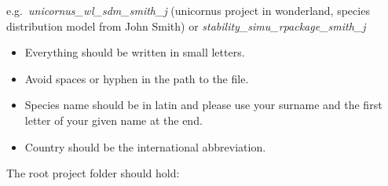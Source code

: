 \documentclass[
  english,
]{article}
\providecommand{\tightlist}{%
  \setlength{\itemsep}{0pt}\setlength{\parskip}{0pt}}
\begin{document}
e.g.~\emph{unicornus\_wl\_sdm\_smith\_j} (unicornus project in
wonderland, species distribution model from John Smith) or
\emph{stability\_simu\_rpackage\_smith\_j}

\begin{itemize}
\tightlist
\item
  Everything should be written in small letters.
\item
  Avoid spaces or hyphen in the path to the file.
\item
  Species name should be in latin and please use your surname and the
  first letter of your given name at the end.
\item
  Country should be the international abbreviation.
\end{itemize}

The root project folder should hold:
\end{document}
